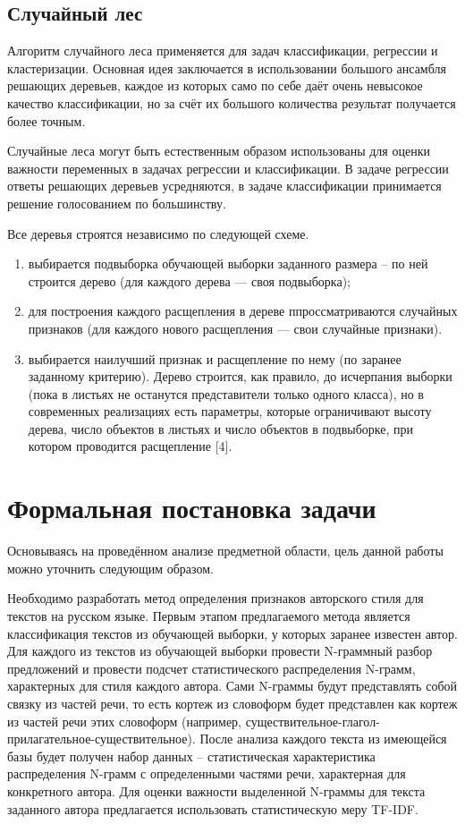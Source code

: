 \subsection{Случайный лес}

Алгоритм случайного леса применяется для задач классификации, регрессии и кластеризации. Основная идея заключается в использовании большого ансамбля решающих деревьев, каждое из которых само по себе даёт очень невысокое качество классификации, но за счёт их большого количества результат получается более точным.

Случайные леса могут быть естественным образом использованы для оценки важности переменных в задачах регрессии и классификации.  В задаче регрессии ответы решающих деревьев усредняются, в задаче классификации принимается решение голосованием по большинству. 

Все деревья строятся независимо по следующей схеме.
\begin{enumerate}
\item выбирается подвыборка обучающей выборки заданного размера – по ней строится дерево (для каждого дерева — своя подвыборка);
\item для построения каждого расщепления в дереве ппроссматриваются случайных признаков (для каждого нового расщепления — свои случайные признаки).
\item выбирается наилучший признак и расщепление по нему (по заранее заданному критерию). Дерево строится, как правило, до исчерпания выборки (пока в листьях не останутся представители только одного класса), но в современных реализациях есть параметры, которые ограничивают высоту дерева, число объектов в листьях и число объектов в подвыборке, при котором проводится расщепление [4].
\end{enumerate}

\section{Формальная постановка задачи}

Основываясь на проведённом анализе предметной области, цель данной работы можно уточнить следующим образом. 

Необходимо разработать метод определения признаков авторского стиля для текстов на русском языке. 
Первым этапом предлагаемого метода является классификация текстов из обучающей выборки, у которых заранее известен автор. Для каждого из текстов из обучающей выборки провести N-граммный разбор предложений и провести подсчет статистического распределения N-грамм, характерных для стиля каждого автора. Сами N-граммы будут представлять собой связку из частей речи, то есть кортеж из словоформ будет представлен как кортеж из частей речи этих словоформ (например, существительное-глагол-прилагательное-существительное).  
После анализа каждого текста из имеющейся базы будет получен набор данных – статистическая характеристика распределения N-грамм с определенными частями речи, характерная для конкретного автора. Для оценки важности выделенной N-граммы для текста заданного автора предлагается использовать статистическую меру TF-IDF.

